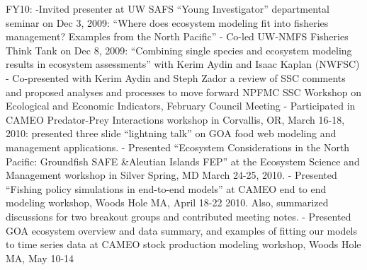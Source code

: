 \documentclass[11pt, a4paper]{awesome-cv}
\begin{document}
FY10: -Invited presenter at UW SAFS ``Young Investigator'' departmental
seminar on Dec 3, 2009: ``Where does ecosystem modeling fit into
fisheries management? Examples from the North Pacific'' - Co-led UW-NMFS
Fisheries Think Tank on Dec 8, 2009: ``Combining single species and
ecosystem modeling results in ecosystem assessments'' with Kerim Aydin
and Isaac Kaplan (NWFSC) - Co-presented with Kerim Aydin and Steph Zador
a review of SSC comments and proposed analyses and processes to move
forward NPFMC SSC Workshop on Ecological and Economic Indicators,
February Council Meeting - Participated in CAMEO Predator-Prey
Interactions workshop in Corvallis, OR, March 16-18, 2010: presented
three slide ``lightning talk'' on GOA food web modeling and management
applications. - Presented ``Ecosystem Considerations in the North
Pacific: Groundfish SAFE \&Aleutian Islands FEP'' at the Ecosystem
Science and Management workshop in Silver Spring, MD March 24-25, 2010.
- Presented ``Fishing policy simulations in end-to-end models'' at CAMEO
end to end modeling workshop, Woods Hole MA, April 18-22 2010. Also,
summarized discussions for two breakout groups and contributed meeting
notes. - Presented GOA ecosystem overview and data summary, and examples
of fitting our models to time series data at CAMEO stock production
modeling workshop, Woods Hole MA, May 10-14
\end{document}
